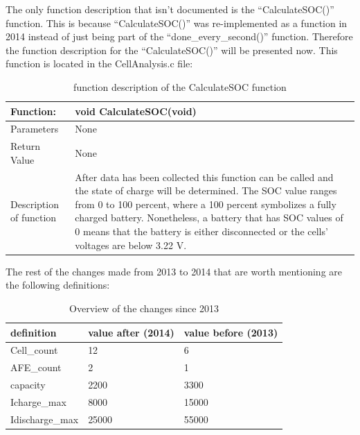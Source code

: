 The only function description that isn’t documented is the “CalculateSOC()” function. This is because “CalculateSOC()” was re-implemented as a function in 2014 instead of just being part of the “done\_every\_second()” function. Therefore the function description for the “CalculateSOC()” will be presented now. This function is located in the CellAnalysis.c file:
\begin{table}[h!]
	\centering
	\label{CalculateSOCfunction}
	\begin{tabular}{|p{4 cm}|p{9 cm}|}
		\hline
		\textbf{Function:} & \textbf{void CalculateSOC(void)}	\\\hline
		Parameters	& None	\\\hline
		Return Value	& None	\\\hline
		Description of function	& After data has been collected this function can be called and the state of charge will be determined. The SOC value ranges from 0 to 100 percent, where a 100 percent symbolizes a fully charged battery. Nonetheless, a battery that has SOC values of 0 means that the battery is either disconnected or the cells' voltages are below 3.22 V. \\\hline
	\end{tabular}
	\caption{function description of the CalculateSOC function}
\end{table}

The rest of the changes made from 2013 to 2014 that are worth mentioning are the following definitions:\\
\begin{table}[h!]
	\centering
	\label{changedDefines}
	\begin{tabular}{|p{4 cm}|p{4 cm}|p{4 cm}|}
		\hline
		\textbf{definition} & \textbf{value after (2014)}	& \textbf{value before (2013)}	\\\hline
		Cell\_count	& 12	& 6	\\\hline
		AFE\_count	& 2	& 1	\\\hline
		capacity	& 2200	& 3300	\\\hline
		Icharge\_max	& 8000	& 15000	\\\hline
		Idischarge\_max	& 25000	& 55000	\\\hline
	\end{tabular}
	\caption{Overview of the changes since 2013}
\end{table}

